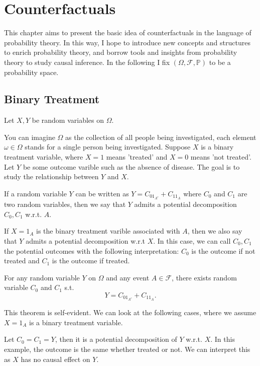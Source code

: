 \chapter{Counterfactuals}


This chapter aims to present the basic idea of counterfactuals in the language of probability theory. 
In this way, I hope to introduce new concepts and structures to enrich probability theory, and borrow tools and insights from probability theory to study causal inference.
In the following I fix $(\Omega,\mathcal{F},\mathbb{P})$ to be a probability space.
\section{Binary Treatment}
 Let $X,Y$ be random variables on $\Omega$.
\begin{example}\label{binary treatment}
    You can imagine $\Omega$ as the collection of all people being investigated, each element $\omega\in\Omega$ stands for a single person being investigated.
    Suppose $X$ is a binary treatment variable, where $X=1$ means 'treated' and $X=0$ means 'not treated'. Let $Y$ be some outcome varible such as the absence of disease.
    The goal is to study the relationship between $Y$ and $X$. 
\end{example}

\begin{definition}
    If a random variable $Y$ can be written as $Y=C_01_{A^c}+C_11_A$ where $C_0$ and $C_1$ are two random variables,
    then we say that $Y$ admits a potential decomposition $C_0,C_1$ w.r.t. $A$.
\end{definition}
\begin{remark}
    If $X=1_A$ is the binary treatment varible associated with $A$, then we also say that $Y$ admits a potential decomposition w.r.t $X$. 
    In this case, we can call $C_0,C_1$ the potential outcomes with the following interpretation: $C_0$ is the outcome if not 
    treated and $C_1$ is the outcome if treated.
\end{remark}

\begin{theorem}[existence]
    For any random variable $Y$ on $\Omega$ and any event $A\in\mathcal{F}$, there exists random variable $C_0$ and $C_1$ s.t. 
    \[Y=C_01_{A^c}+C_11_{A}.\]
\end{theorem}
This theorem is self-evident. We can look at the following cases, where we assume $X=1_A$ is a binary treatment variable. 
\begin{example}
    Let $C_0=C_1=Y$, then it is a potential decomposition of $Y$ w.r.t. $X$. In this example, the outcome is the same whether treated or not.
    We can interpret this as $X$ has no causal effect on $Y$.
\end{example}

